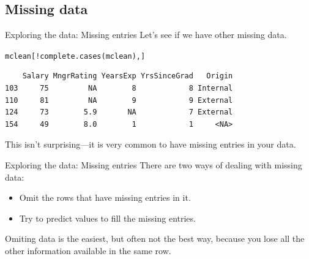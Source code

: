 \documentclass{beamer}\usepackage[]{graphicx}\usepackage[]{color}
\makeatletter
\newcommand{\hlnum}[1]{\textcolor[rgb]{0.824,0.412,0.118}{#1}}%
\newcommand{\hlopt}[1]{\textcolor[rgb]{1,0.894,0.769}{#1}}%
\newcommand{\hlstd}[1]{\textcolor[rgb]{1,0.894,0.769}{#1}}%
\newcommand{\hlkwb}[1]{\textcolor[rgb]{0.804,0.776,0.451}{#1}}%
\newcommand{\hlkwd}[1]{\textcolor[rgb]{1,0.78,0.769}{#1}}%
\newenvironment{kframe}{%
 \def\at@end@of@kframe{}%
 \ifinner\ifhmode%
  \def\at@end@of@kframe{\end{minipage}}%
  \begin{minipage}{\columnwidth}%
 \fi\fi%
 \def\FrameCommand##1{\hskip\@totalleftmargin \hskip-\fboxsep
 \colorbox{shadecolor}{##1}\hskip-\fboxsep
     \hskip-\linewidth \hskip-\@totalleftmargin \hskip\columnwidth}%
 \MakeFramed {\advance\hsize-\width
   \@totalleftmargin\z@ \linewidth\hsize
   \@setminipage}}%
 {\par\unskip\endMakeFramed%
 \at@end@of@kframe}
\newenvironment{knitrout}{}{} %
\makeatother
\begin{document}
\begin{darkframes}
    
    \section{Missing data}
    
    \begin{frame}[fragile]{Exploring the data: Missing entries}
      Let's see if we have other missing data. \pause
\begin{knitrout}
\begin{kframe}
\begin{alltt}
  \hlstd{mclean[}\hlopt{!}\hlkwd{complete.cases}\hlstd{(mclean),]}
\end{alltt}
\begin{verbatim}
    Salary MngrRating YearsExp YrsSinceGrad   Origin
103     75         NA        8            8 Internal
110     81         NA        9            9 External
124     73        5.9       NA            7 External
154     49        8.0        1            1     <NA>
\end{verbatim}
\end{kframe}
\end{knitrout}
      \pause
      This isn't surprising---it is very common to have missing entries in your data.
    \end{frame}
    
  
  
  
    \begin{frame}[fragile]{Exploring the data: Missing entries}
      There are two ways of dealing with missing data:
      \begin{itemize}[<+->]
        \item Omit the rows that have missing entries in it.
        \item Try to predict values to fill the missing entries.      
      \end{itemize}
      Omiting data is the easiest, but often \alert{not the best way, because you lose all the other information available in the same row}. \pause \bigskip
      

\end{frame}
\end{darkframes}
\end{document}

